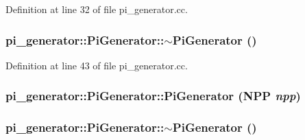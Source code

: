 Definition at line 32 of file pi\_\-generator.cc.

\hypertarget{classpi__generator_1_1_pi_generator_ac7d9c07492fd86678b8f66643e1e8c1e}{
\subsubsection[{$\sim$PiGenerator}]{\setlength{\rightskip}{0pt plus 5cm}pi\_\-generator::PiGenerator::$\sim$PiGenerator ()}}
\label{classpi__generator_1_1_pi_generator_ac7d9c07492fd86678b8f66643e1e8c1e}


Definition at line 43 of file pi\_\-generator.cc.

\hypertarget{classpi__generator_1_1_pi_generator_a0f5a55bbb942dee1b185447f0a7e24be}{
\subsubsection[{PiGenerator}]{\setlength{\rightskip}{0pt plus 5cm}pi\_\-generator::PiGenerator::PiGenerator (NPP {\em npp})}}
\label{classpi__generator_1_1_pi_generator_a0f5a55bbb942dee1b185447f0a7e24be}
\hypertarget{classpi__generator_1_1_pi_generator_ac7d9c07492fd86678b8f66643e1e8c1e}{
\subsubsection[{$\sim$PiGenerator}]{\setlength{\rightskip}{0pt plus 5cm}pi\_\-generator::PiGenerator::$\sim$PiGenerator ()}}
\label{classpi__generator_1_1_pi_generator_ac7d9c07492fd86678b8f66643e1e8c1e}


